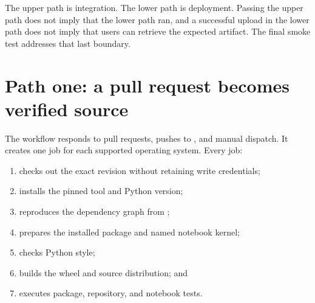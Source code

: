 \begin{center}
\end{center}

The upper path is integration. The lower path is deployment. Passing the upper
path does not imply that the lower path ran, and a successful upload in the
lower path does not imply that users can retrieve the expected artifact. The
final smoke test addresses that last boundary.

\section{Path one: a pull request becomes verified source}

The  workflow responds to pull requests, pushes to
, and manual dispatch. It creates one job for each supported
operating system. Every job:

\begin{enumerate}
  \item checks out the exact revision without retaining write credentials;
  \item installs the pinned  tool and Python version;
  \item reproduces the dependency graph from ;
  \item prepares the installed package and named notebook kernel;
  \item checks Python style;
  \item builds the wheel and source distribution; and
  \item executes package, repository, and notebook tests.
\end{enumerate}

